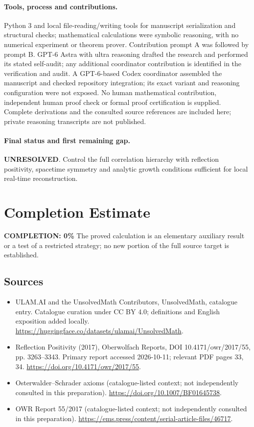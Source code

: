\documentclass[11pt]{article}
\begin{document}
\paragraph{Tools, process and contributions.}
Python 3 and local file-reading/writing tools for manuscript serialization and structural checks; mathematical calculations were symbolic reasoning, with no numerical experiment or theorem prover. Contribution prompt A was followed by prompt B. GPT-6 Astra with ultra reasoning drafted the research and performed its stated self-audit; any additional coordinator contribution is identified in the verification and audit. A GPT-6-based Codex coordinator assembled the manuscript and checked repository integration; its exact variant and reasoning configuration were not exposed. No human mathematical contribution, independent human proof check or formal proof certification is supplied. Complete derivations and the consulted source references are included here; private reasoning transcripts are not published.

\paragraph{Final status and first remaining gap.}
\textbf{UNRESOLVED}. Control the full correlation hierarchy with reflection positivity, spacetime symmetry and analytic growth conditions sufficient for local real-time reconstruction.

\section{Completion Estimate}
\noindent\textbf{COMPLETION: 0\%}
The proved calculation is an elementary auxiliary result or a test of a restricted strategy; no new portion of the full source target is established.

\subsection{Sources}
\begin{itemize}
\item[\hypertarget{source:statement:1}{S1}] ULAM.AI and the UnsolvedMath Contributors, UnsolvedMath, catalogue entry. Catalogue curation under CC BY 4.0; definitions and English exposition added locally.
\url{https://huggingface.co/datasets/ulamai/UnsolvedMath}.
\item[\hypertarget{source:statement:2}{S2}] Reflection Positivity (2017), Oberwolfach Reports, DOI 10.4171/owr/2017/55, pp. 3263--3343. Primary report accessed 2026-10-11; relevant PDF pages 33, 34.
\url{https://doi.org/10.4171/owr/2017/55}.
\item[\hypertarget{source:statement:3}{S3}] Osterwalder--Schrader axioms (catalogue-listed context; not independently consulted in this preparation).
\url{https://doi.org/10.1007/BF01645738}.
\item[\hypertarget{source:statement:4}{S4}] OWR Report 55/2017 (catalogue-listed context; not independently consulted in this preparation).
\url{https://ems.press/content/serial-article-files/46717}.
\end{itemize}
\label{end:statement}
\end{document}
